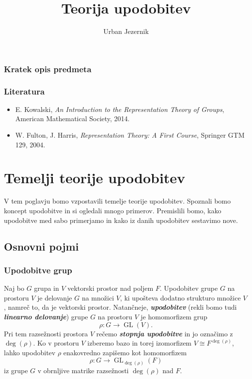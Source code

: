 \documentclass[11pt]{book}
\title{\bf Teorija upodobitev}
\author{Urban Jezernik}
\DeclareMathOperator\GL{GL}
\def\definicija{\color{rdeca}\bf\em}
\def\literatura{\color{modra}}
\theoremstyle{definition}
\theoremstyle{zgled}
\theoremstyle{odprtproblem}
\theoremstyle{domacanaloga}
\theoremstyle{izrek}
\begin{document}
\baselineskip=14pt

\maketitle

\setcounter{tocdepth}{1}
\tableofcontents

\newpage

\subsection*{Kratek opis predmeta}


\subsection*{Literatura}

\begin{itemize}
\item {\literatura E. Kowalski, {\em An Introduction to the Representation Theory of Groups}, American Mathematical Society, 2014.} 
\item {\literatura W. Fulton, J. Harris, {\em Representation Theory: A First Course}, Springer GTM 129, 2004.}
\end{itemize}

\chapter{Temelji teorije upodobitev}

V tem poglavju bomo vzpostavili temelje teorije upodobitev. Spoznali bomo koncept upodobitve in si ogledali mnogo primerov. Premislili bomo, kako upodobitve med sabo primerjamo in kako iz danih upodobitev sestavimo nove.

\section{Osnovni pojmi}

\subsection{Upodobitve grup}

Naj bo $G$ grupa in $V$ vektorski prostor nad poljem $F$. Upodobitev grupe $G$ na prostoru $V$ je delovanje $G$ na množici $V$, ki upošteva dodatno strukturo množice $V$, namreč to, da je vektorski prostor. Natančneje, {\definicija upodobitev} (rekli bomo tudi {\definicija linearno delovanje}) grupe $G$ na prostoru $V$ je homomorfizem grup
\[
    \rho \colon G \to \GL(V).
\]
Pri tem razsežnosti prostora $V$ rečemo {\definicija stopnja upodobitve} in jo označimo z $\deg(\rho)$. Ko v prostoru $V$ izberemo bazo in torej izomorfizem $V \cong F^{\deg(\rho)}$, lahko upodobitev $\rho$ enakovredno zapišemo kot homomorfizem
\[
    \rho \colon G \to \textstyle \GL_{\deg(\rho)}(F)
\]
iz grupe $G$ v obrnljive matrike razsežnosti $\deg(\rho)$ nad $F$.
\end{document}
